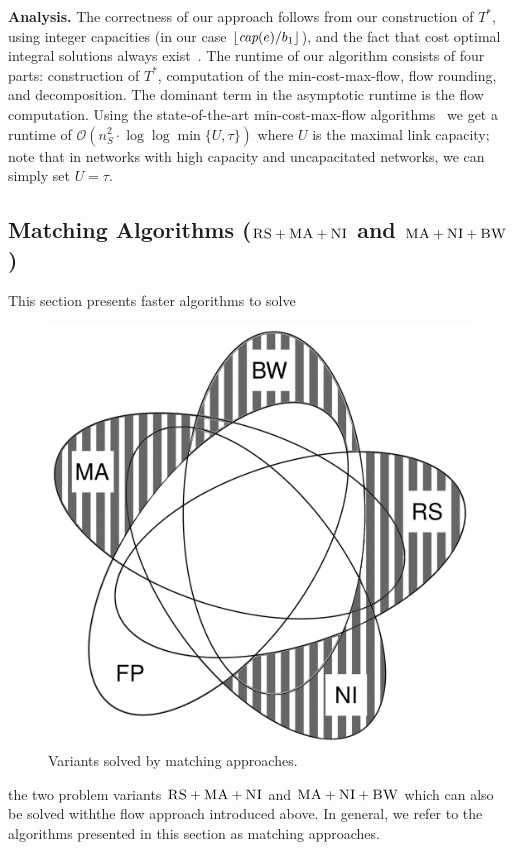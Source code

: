 \documentclass[preprint,12pt]{elsarticle}
\newcommand{\capacity}{\emph{cap}}
\newcommand{\CC}{\textsc{NI}}
\newcommand{\RS}{\textsc{RS}}
\newcommand{\BW}{\textsc{BW}}
\newcommand{\MA}{\textsc{MA}}
\newcommand{\Tree}{\ensuremath{T}}
\newcommand{\CostTrans}{\ensuremath{b_1}}
\begin{document}
\textbf{Analysis.}
The correctness of our approach follows from our construction
of $\Tree^*$, using integer capacities (in our case $\lfloor\capacity(e)/\CostTrans\rfloor$),
and the fact that cost optimal integral solutions always exist~\cite{flow-book}.
The runtime of our algorithm consists of four parts: construction of $\Tree^*$,
computation of the min-cost-max-flow, flow rounding, and decomposition. The
dominant term in the asymptotic runtime is the flow computation.
Using the state-of-the-art min-cost-max-flow
algorithms~\cite{mincostmaxflow-1,mincostmaxflow-2}
we get a runtime of $\mathcal{O}(n_S^2 \cdot \log\log \min \{U,\tau\})$
where $U$ is the maximal link capacity; note that in networks with high capacity
and uncapacitated networks, we can simply set $U=\tau$.


\subsection{Matching Algorithms ($\RS+\MA+\CC$ and $\MA+\CC+\BW$)}\label{ssec:match}



This section presents faster algorithms to solve 
\begin{figure}
\vspace{-1em}
\includegraphics[width=0.48\columnwidth]{figs/venn_matching.pdf}
\caption{Variants solved by matching approaches.}
\vspace{-1em}
\label{fig:venn_match}
\end{figure}
the two problem variants
$\RS+\MA+\CC$ and $\MA+\CC+\BW$ which can also be solved withthe flow approach
introduced above.
In general, we refer to the algorithms presented in this section
as matching approaches.
\end{document}
